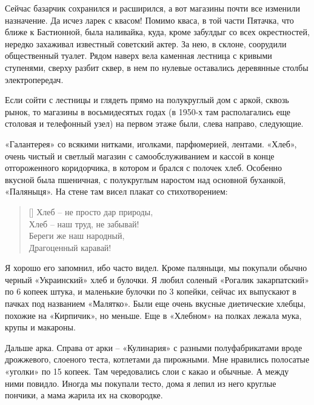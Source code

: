 Сейчас базарчик сохранился и расширился, а вот магазины почти все изменили назначение. Да исчез ларек с квасом! Помимо кваса, в той части Пятачка, что ближе к Бастионной, была наливайка, куда, кроме забулдыг со всех окрестностей, нередко захаживал известный советский актер. За нею, в склоне, соорудили общественный туалет. Рядом наверх вела каменная лестница с кривыми ступенями, сверху разбит сквер, в нем по нулевые оставались деревянные столбы электропередач.

Если сойти с лестницы и глядеть прямо на полукруглый дом с аркой, сквозь рынок, то магазины в восьмидесятых годах (в 1950-х там располагались еще столовая и телефонный узел) на первом этаже были, слева направо, следующие.

«Галантерея» со всякими нитками, иголками, парфюмерией, лентами. «Хлеб», очень чистый и светлый магазин с самообслуживанием и кассой в конце отгороженного коридорчика, в котором и брался с полочек хлеб. Особенно вкусной была пшеничная, с полукруглым наростом над основной буханкой, «Паляныця». На стене там висел плакат со стихотворением:

\settowidth{\versewidth}{Хлеб – не просто дар природы,}
\begin{verse}[\versewidth]
Хлеб – не просто дар природы,\\
Хлеб – наш труд, не забывай!\\
Береги же наш народный,\\
Драгоценный каравай!
\end{verse}

Я хорошо его запомнил, ибо часто видел. Кроме паляныци, мы покупали обычно черный «Украинский» хлеб и булочки. Я любил соленый «Рогалик закарпатский» по 6 копеек штука, и маленькие булочки по 3 копейки, сейчас их выпускают в пачках под названием «Малятко». Были еще очень вкусные диетические хлебцы, похожие на «Кирпичик», но меньше. Еще в «Хлебном» на полках лежала мука, крупы и макароны.

Дальше арка. Справа от арки – «Кулинария» с разными полуфабрикатами вроде дрожжевого, слоеного теста, котлетами да пирожными. Мне нравились полосатые «уголки» по 15 копеек. Там чередовались слои с какао и обычные. А между ними повидло. Иногда мы покупали тесто, дома я лепил из него круглые пончики, а мама жарила их на сковородке.


